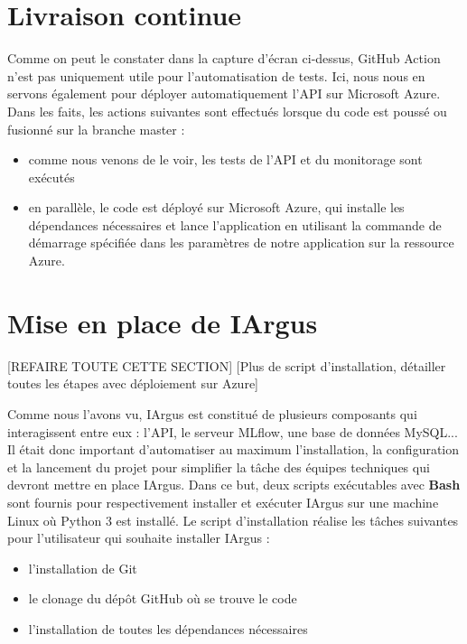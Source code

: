 \documentclass[french]{article}
\begin{document}
    \section{Livraison continue}
    
    Comme on peut le constater dans la capture d'écran ci-dessus, GitHub Action n'est pas uniquement utile pour l'automatisation de tests. Ici, nous nous en servons également pour déployer automatiquement l'API sur Microsoft Azure. Dans les faits, les actions suivantes sont effectués lorsque du code est poussé ou fusionné sur la branche master :
    \begin{itemize}
        \item comme nous venons de le voir, les tests de l'API et du monitorage sont exécutés
        \item en parallèle, le code est déployé sur Microsoft Azure, qui installe les dépendances nécessaires et lance l'application en utilisant la commande de démarrage spécifiée dans les paramètres de notre application sur la ressource Azure.
    \end{itemize}
    

    \section{Mise en place de IArgus} \label{mise_en_place}

    [REFAIRE TOUTE CETTE SECTION]
    [Plus de script d'installation, détailler toutes les étapes avec déploiement sur Azure]

    Comme nous l'avons vu, IArgus est constitué de plusieurs composants qui interagissent entre eux : l'API, le serveur MLflow, une base de données MySQL... Il était donc important d'automatiser au maximum l'installation, la configuration et la lancement du projet pour simplifier la tâche des équipes techniques qui devront mettre en place IArgus. Dans ce but, deux scripts exécutables avec \textbf{Bash} sont fournis pour respectivement installer et exécuter IArgus sur une machine Linux où Python 3 est installé. Le script d'installation réalise les tâches suivantes pour l'utilisateur qui souhaite installer IArgus :
    \begin{itemize}
        \item l'installation de Git
        \item le clonage du dépôt GitHub où se trouve le code
        \item l'installation de toutes les dépendances nécessaires
    \end{itemize} 
\end{document}
